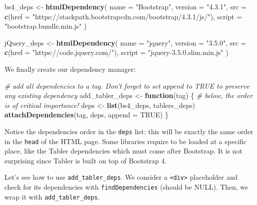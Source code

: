 \documentclass[
]{book}
\newenvironment{Shaded}{\begin{snugshade}}{\end{snugshade}}
\newcommand{\CommentTok}[1]{\textcolor[rgb]{0.56,0.35,0.01}{\textit{#1}}}
\newcommand{\ControlFlowTok}[1]{\textcolor[rgb]{0.13,0.29,0.53}{\textbf{#1}}}
\newcommand{\DataTypeTok}[1]{\textcolor[rgb]{0.13,0.29,0.53}{#1}}
\newcommand{\KeywordTok}[1]{\textcolor[rgb]{0.13,0.29,0.53}{\textbf{#1}}}
\newcommand{\NormalTok}[1]{#1}
\newcommand{\OtherTok}[1]{\textcolor[rgb]{0.56,0.35,0.01}{#1}}
\newcommand{\StringTok}[1]{\textcolor[rgb]{0.31,0.60,0.02}{#1}}
\begin{document}
\begin{Shaded}
\begin{Highlighting}[]
\NormalTok{bs4_deps <-}\StringTok{ }\KeywordTok{htmlDependency}\NormalTok{(}
  \DataTypeTok{name =} \StringTok{"Bootstrap"}\NormalTok{,}
  \DataTypeTok{version =} \StringTok{"4.3.1"}\NormalTok{,}
  \DataTypeTok{src =} \KeywordTok{c}\NormalTok{(}\DataTypeTok{href =} \StringTok{"https://stackpath.bootstrapcdn.com/bootstrap/4.3.1/js/"}\NormalTok{),}
  \DataTypeTok{script =} \StringTok{"bootstrap.bundle.min.js"}
\NormalTok{)}

\NormalTok{jQuery_deps <-}\StringTok{ }\KeywordTok{htmlDependency}\NormalTok{(}
  \DataTypeTok{name =} \StringTok{"jquery"}\NormalTok{,}
  \DataTypeTok{version =} \StringTok{"3.5.0"}\NormalTok{,}
  \DataTypeTok{src =} \KeywordTok{c}\NormalTok{(}\DataTypeTok{href =} \StringTok{"https://code.jquery.com/"}\NormalTok{),}
  \DataTypeTok{script =} \StringTok{"jquery-3.5.0.slim.min.js"}
\NormalTok{)}
\end{Highlighting}
\end{Shaded}

We finally create our dependency manager:

\begin{Shaded}
\begin{Highlighting}[]
\CommentTok{# add all dependencies to a tag. Don't forget to set append to TRUE to preserve any existing dependency}
\NormalTok{add_tabler_deps <-}\StringTok{ }\ControlFlowTok{function}\NormalTok{(tag) \{}
  \CommentTok{# below, the order is of critical importance!}
\NormalTok{  deps <-}\StringTok{ }\KeywordTok{list}\NormalTok{(bs4_deps, tablers_deps)}
  \KeywordTok{attachDependencies}\NormalTok{(tag, deps, }\DataTypeTok{append =} \OtherTok{TRUE}\NormalTok{)}
\NormalTok{\}}
\end{Highlighting}
\end{Shaded}

Notice the dependencies order in the \texttt{deps} list: this will be exactly the same order in the \texttt{head} of the HTML page. Some libraries require to be loaded at a specific place, like the Tabler dependencies which must come after Bootstrap.
It is not surprising since Tabler is built on top of Bootstrap 4.

Let's see how to use \texttt{add\_tabler\_deps}. We consider a \texttt{\textless{}div\textgreater{}} placeholder and check for its dependencies with \texttt{findDependencies} (should be NULL). Then, we wrap it with \texttt{add\_tabler\_deps}.
\end{document}
